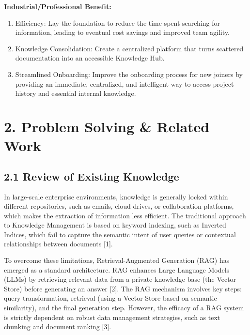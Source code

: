 \documentclass[12pt]{article}
\begin{document}
\textbf{Industrial/Professional Benefit:}

\begin{enumerate}
\def\labelenumi{\arabic{enumi}.}
\item
  Efficiency: Lay the foundation to reduce the time spent searching for
  information, leading to eventual cost savings and improved team
  agility.
\item
  Knowledge Consolidation: Create a centralized platform that turns
  scattered documentation into an accessible Knowledge Hub.
\item
  Streamlined Onboarding: Improve the onboarding process for new joiners
  by providing an immediate, centralized, and intelligent way to access
  project history and essential internal knowledge.
\end{enumerate}

\section{2. Problem Solving \& Related
Work}\label{problem-solving-related-work}

\subsection{2.1 Review of Existing
Knowledge}\label{review-of-existing-knowledge}

In large-scale enterprise environments, knowledge is generally locked
within different repositories, such as emails, cloud drives, or
collaboration platforms, which makes the extraction of information less
efficient. The traditional approach to Knowledge Management is based on
keyword indexing, such as Inverted Indices, which fail to capture the
semantic intent of user queries or contextual relationships between
documents {[}1{]}.

To overcome these limitations, Retrieval-Augmented Generation (RAG) has
emerged as a standard architecture. RAG enhances Large Language Models
(LLMs) by retrieving relevant data from a private knowledge base (the
Vector Store) before generating an answer {[}2{]}. The RAG mechanism
involves key steps: query transformation, retrieval (using a Vector
Store based on semantic similarity), and the final generation step.
However, the efficacy of a RAG system is strictly dependent on robust
data management strategies, such as text chunking and document ranking
{[}3{]}.
\end{document}
